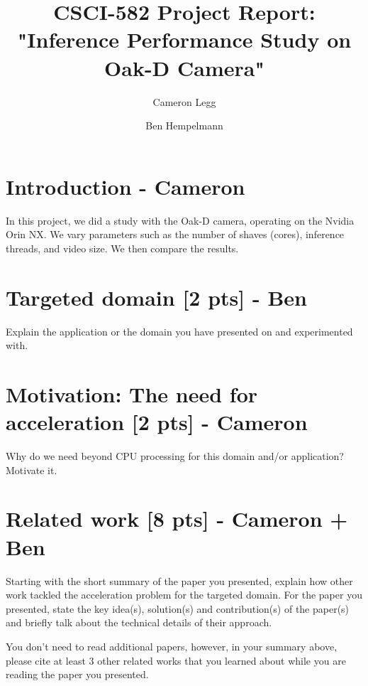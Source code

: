 \documentclass[sigconf,authorversion,nonacm]{acmart}
\begin{document}
\title{CSCI-582 Project Report: "Inference Performance Study on Oak-D Camera"}

\author{Cameron Legg}

\author{Ben Hempelmann}

\maketitle

\section{Introduction - Cameron}
In this project, we did a study with the Oak-D camera, operating on the Nvidia Orin NX. We vary parameters such as the number of shaves (cores), inference threads, and video size. We then compare the results.

\section{Targeted domain {\small [2 pts]} - Ben}
Explain the application or the domain you have presented on and experimented with. 

\section{Motivation: The need for acceleration {\small {[2 pts]}} - Cameron}

Why do we need beyond CPU processing for this domain and/or application? Motivate it.

\section{Related work {\small {[8 pts]}} - Cameron + Ben}
Starting with the short summary of the paper you presented, explain how other work tackled the acceleration problem for the targeted domain. For the paper you presented, state the key idea(s), solution(s) and contribution(s) of the paper(s) and briefly talk about the technical details of their approach.

You don't need to read additional papers, however, in your summary above, please cite at least 3 other related works that you learned about while you are reading the paper you presented. 
\end{document}
